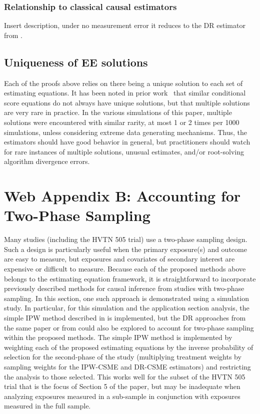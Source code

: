 \documentclass[12pt]{article}
\begin{document}
\subsubsection{Relationship to classical causal estimators}

Insert description, under no measurement error it reduces to the DR estimator from \citet{neugebauer2005}.

\subsection{Uniqueness of EE solutions}

Each of the proofs above relies on there being a unique solution to each set of estimating equations. It has been noted in prior work~\citep{stefanski1987} that similar conditional score equations do not always have unique solutions, but that multiple solutions are very rare in practice. In the various simulations of this paper, multiple solutions were encountered with similar rarity, at most 1 or 2 times per 1000 simulations, unless considering extreme data generating mechanisms. Thus, the estimators should have good behavior in general, but practitioners should watch for rare instances of multiple solutions, unusual estimates, and/or root-solving algorithm divergence errors.

\section{Web Appendix B: Accounting for Two-Phase Sampling}

Many studies (including the HVTN 505 trial) use a two-phase sampling design. Such a design is particularly useful when the primary exposure(s) and outcome are easy to measure, but exposures and covariates of secondary interest are expensive or difficult to measure. Because each of the proposed methods above belongs to the estimating equation framework, it is straightforward to incorporate previously described methods for causal inference from studies with two-phase sampling. In this section, one such approach is demonstrated using a simulation study. In particular, for this simulation and the application section analysis, the simple IPW method described in \citet{wang2009} is implemented, but the DR approaches from the same paper or from \citet{rose2011} could also be explored to account for two-phase sampling within the proposed methods. The simple IPW method is implemented by weighting each of the proposed estimating equations by the inverse probability of selection for the second-phase of the study (multiplying treatment weights by sampling weights for the IPW-CSME and DR-CSME estimators) and restricting the analysis to those selected. This works well for the subset of the HVTN 505 trial that is the focus of Section 5 of the paper, but may be inadequate when analyzing exposures measured in a sub-sample in conjunction with exposures measured in the full sample.
\end{document}
